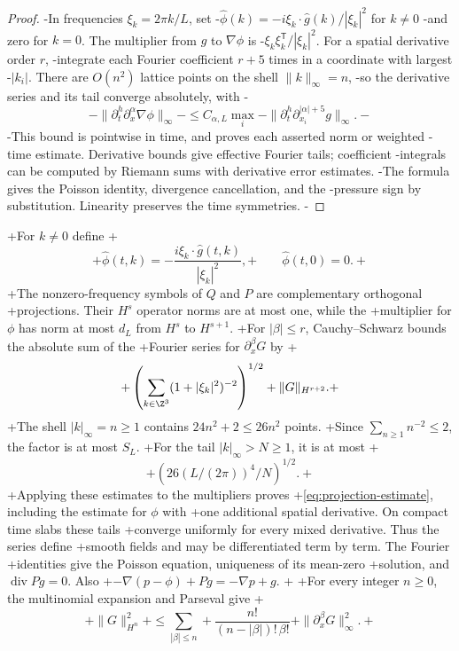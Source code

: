  \begin{proof}
-In frequencies $\xi_k=2\pi k/L$, set
-$\widehat\phi(k)=-i\xi_k\cdot\widehat g(k)/|\xi_k|^2$ for $k\ne0$
-and zero for $k=0$. The multiplier from $g$ to $\nabla\phi$ is
-$\xi_k\xi_k^{\mathsf T}/|\xi_k|^2$. For a spatial derivative order $r$,
-integrate each Fourier coefficient $r+5$ times in a coordinate with largest
-$|k_i|$. There are $O(n^2)$ lattice points on the shell $\|k\|_\infty=n$,
-so the derivative series and its tail converge absolutely, with
-\[
- \|\partial_t^h\partial_x^\alpha\nabla\phi\|_\infty
- \le C_{\alpha,L}\max_i
-       \|\partial_t^h\partial_{x_i}^{|\alpha|+5}g\|_\infty.
-\]
-This bound is pointwise in time, and proves each asserted norm or weighted
-time estimate. Derivative bounds give effective Fourier tails; coefficient
-integrals can be computed by Riemann sums with derivative error estimates.
-The formula gives the Poisson identity, divergence cancellation, and the
-pressure sign by substitution. Linearity preserves the time symmetries.
-\end{proof}
+For $k\ne0$ define
+\[
+ \widehat\phi(t,k)=-\frac{i\xi_k\cdot\widehat g(t,k)}{|\xi_k|^2},
+ \qquad \widehat\phi(t,0)=0.
+\]
+The nonzero-frequency symbols of $Q$ and $P$ are complementary orthogonal
+projections. Their $H^s$ operator norms are at most one, while the
+multiplier for $\phi$ has norm at most $d_L$ from $H^s$ to $H^{s+1}$.
+For $|\beta|\le r$, Cauchy--Schwarz bounds the absolute sum of the
+Fourier series for $\partial_x^\beta G$ by
+\[
+ \left(\sum_{k\in\Z^3}(1+|\xi_k|^2)^{-2}\right)^{1/2}
+ \|G\|_{H^{r+2}}.
+\]
+The shell $|k|_\infty=n\ge1$ contains $24n^2+2\le26n^2$ points.
+Since $\sum_{n\ge1}n^{-2}\le2$, the factor is at most $S_L$.
+For the tail $|k|_\infty>N\ge1$, it is at most
+\begin{equation}\label{eq:projection-tail}
+ \left(26(L/(2\pi))^4/N\right)^{1/2}.
+\end{equation}
+Applying these estimates to the multipliers proves
+\eqref{eq:projection-estimate}, including the estimate for $\phi$ with
+one additional spatial derivative. On compact time slabs these tails
+converge uniformly for every mixed derivative. Thus the series define
+smooth fields and may be differentiated term by term. The Fourier
+identities give the Poisson equation, uniqueness of its mean-zero
+solution, and $\operatorname{div}Pg=0$. Also
+$-\nabla(p-\phi)+Pg=-\nabla p+g$.
+
+For every integer $n\ge0$, the multinomial expansion and Parseval give
+\begin{equation}\label{eq:projection-derivative-bounds}
+ \|G\|_{H^n}^2
+ \le\sum_{|\beta|\le n}
+       \frac{n!}{(n-|\beta|)!\,\beta!}
+       \|\partial_x^\beta G\|_\infty^2.
+\end{equation}
